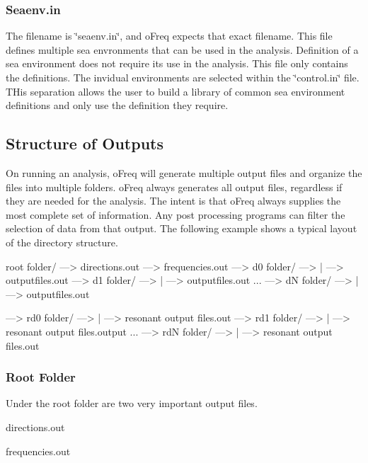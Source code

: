 \subsubsection*{Seaenv.\-in}

The filename is \char`\"{}seaenv.\-in\char`\"{}, and o\-Freq expects that exact filename. This file defines multiple sea envronments that can be used in the analysis. Definition of a sea environment does not require its use in the analysis. This file only contains the definitions. The invidual environments are selected within the \char`\"{}control.\-in\char`\"{} file. T\-His separation allows the user to build a library of common sea environment definitions and only use the definition they require.\hypertarget{directory_structure_outputs_structure1}{}\subsection{Structure of Outputs}\label{directory_structure_outputs_structure1}
On running an analysis, o\-Freq will generate multiple output files and organize the files into multiple folders. o\-Freq always generates all output files, regardless if they are needed for the analysis. The intent is that o\-Freq always supplies the most complete set of information. Any post processing programs can filter the selection of data from that output. The following example shows a typical layout of the directory structure. \begin{DoxyVerb}root folder/
--->  directions.out
--->  frequencies.out
--->  d0 folder/
---> | --->  outputfiles.out
--->  d1 folder/
---> | --->  outputfiles.out
...
--->  dN folder/
---> | --->  outputfiles.out

--->  rd0 folder/
---> | ---> resonant output files.out
--->  rd1 folder/
---> | ---> resonant output files.output
...
--->  rdN folder/
---> | ---> resonant output files.out
\end{DoxyVerb}
\hypertarget{directory_structure_root}{}\subsubsection{Root Folder}\label{directory_structure_root}
Under the root folder are two very important output files.


\begin{DoxyEnumerate}
\item directions.\-out
\item frequencies.\-out
\end{DoxyEnumerate}

